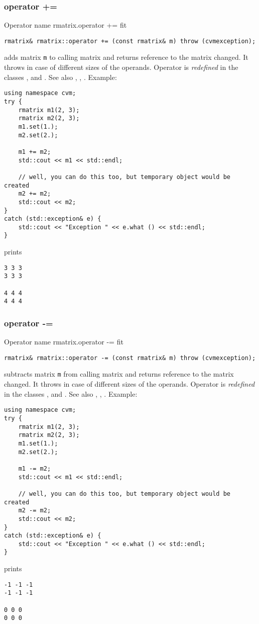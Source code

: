 \subsubsection{operator +=}
Operator%
\pdfdest name {rmatrix.operator +=} fit
\begin{verbatim}
rmatrix& rmatrix::operator += (const rmatrix& m) throw (cvmexception);
\end{verbatim}
adds  matrix \verb"m" to  calling matrix
and returns  reference to
the matrix changed.
It throws  
in case of different sizes of the operands.
Operator is \emph{redefined} in the classes
, 
and .
See also ,
,
.
Example:
\begin{Verbatim}
using namespace cvm;
try {
    rmatrix m1(2, 3);
    rmatrix m2(2, 3);
    m1.set(1.);
    m2.set(2.);

    m1 += m2;
    std::cout << m1 << std::endl;

    // well, you can do this too, but temporary object would be created
    m2 += m2;
    std::cout << m2;
}
catch (std::exception& e) {
    std::cout << "Exception " << e.what () << std::endl;
}
\end{Verbatim}
prints
\begin{Verbatim}
3 3 3
3 3 3

4 4 4
4 4 4
\end{Verbatim}
\newpage




\subsubsection{operator -=}
Operator%
\pdfdest name {rmatrix.operator -=} fit
\begin{verbatim}
rmatrix& rmatrix::operator -= (const rmatrix& m) throw (cvmexception);
\end{verbatim}
subtracts  matrix \verb"m" from  calling matrix
and returns  reference to
the matrix changed.
It throws  
in case of different sizes of the operands.
Operator is \emph{redefined} in the classes
, 
and .
See also ,
,
.
Example:
\begin{Verbatim}
using namespace cvm;
try {
    rmatrix m1(2, 3);
    rmatrix m2(2, 3);
    m1.set(1.);
    m2.set(2.);

    m1 -= m2;
    std::cout << m1 << std::endl;

    // well, you can do this too, but temporary object would be created
    m2 -= m2;
    std::cout << m2;
}
catch (std::exception& e) {
    std::cout << "Exception " << e.what () << std::endl;
}
\end{Verbatim}
prints
\begin{Verbatim}
-1 -1 -1
-1 -1 -1

0 0 0
0 0 0
\end{Verbatim}
\newpage




